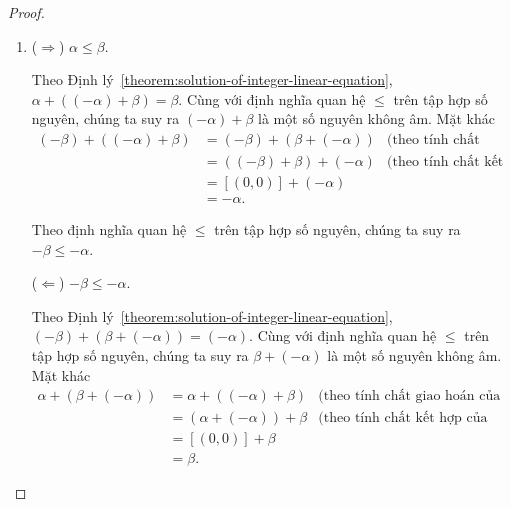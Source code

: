 \begin{proof}
    \begin{enumerate}[label={(\roman*)}]
        \item ($\Rightarrow$) $\alpha\leq\beta$.

              Theo Định lý~\ref{theorem:solution-of-integer-linear-equation}, $\alpha + ((-\alpha) + \beta) = \beta$. Cùng với định nghĩa quan hệ $\leq$ trên tập hợp số nguyên, chúng ta suy ra $(-\alpha) + \beta$ là một số nguyên không âm. Mặt khác
              \begin{align*}
                  (-\beta) + ((-\alpha) + \beta) & = (-\beta) + (\beta + (-\alpha)) & \text{(theo tính chất giao hoán của phép cộng số nguyên)} \\
                                                 & = ((-\beta) + \beta) + (-\alpha) & \text{(theo tính chất kết hợp của phép cộng số nguyên)}   \\
                                                 & = [(0,0)] + (-\alpha)                                                                        \\
                                                 & = -\alpha.
              \end{align*}

              Theo định nghĩa quan hệ $\leq$ trên tập hợp số nguyên, chúng ta suy ra $-\beta\leq -\alpha$.

              ($\Leftarrow$) $-\beta\leq -\alpha$.

              Theo Định lý~\ref{theorem:solution-of-integer-linear-equation}, $(-\beta) + (\beta + (-\alpha)) = (-\alpha)$. Cùng với định nghĩa quan hệ $\leq$ trên tập hợp số nguyên, chúng ta suy ra $\beta + (-\alpha)$ là một số nguyên không âm. Mặt khác
              \begin{align*}
                  \alpha + (\beta + (-\alpha)) & = \alpha + ((-\alpha) + \beta) & \text{(theo tính chất giao hoán của phép cộng hai số nguyên)} \\
                                               & = (\alpha + (-\alpha)) + \beta & \text{(theo tính chất kết hợp của phép cộng hai số nguyên)}   \\
                                               & = [(0,0)] + \beta                                                                              \\
                                               & = \beta.
              \end{align*}


\end{enumerate}
\end{proof}
